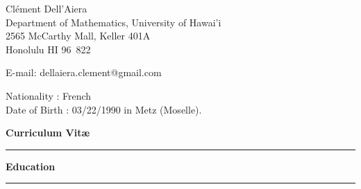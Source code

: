 \documentclass[a4paper,11pt]{article}
\newcommand{\titre}[1]{%
	\begin{center}
	\bigskip
	\rule{\textwidth}{1pt}
	\par\vspace{0.1cm}
        \textbf{\large #1}
	\par\rule{\textwidth}{1pt}
	\end{center}
	\bigskip
	}
\begin{document}
\begin{flushleft}
Clément Dell'Aiera \\
Department of Mathematics, University of Hawai'i\\
2565 McCarthy Mall, Keller 401A \\
Honolulu HI 96\ 822 \\

\medskip

E-mail: dellaiera.clement@gmail.com


\end{flushleft}
\begin{flushleft}
Nationality : French \\
Date of Birth : 03/22/1990 in Metz (Moselle).
\end{flushleft}

\vspace{1.5cm}
\begin{center}
\par\huge{\textbf{Curriculum Vit\ae} }
\end{center}

\titre{Education}
\end{document}
